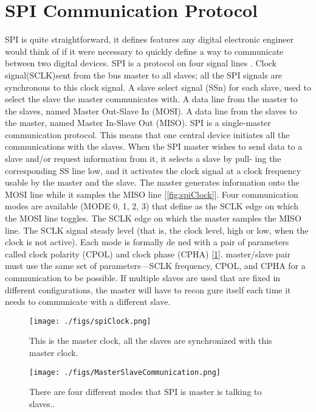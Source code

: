 \documentclass{IEEEtran}
\begin{document}
\section{SPI Communication Protocol}
SPI is quite straightforward, it defines features any digital electronic engineer would think of if it were necessary to quickly define a way to communicate between two digital devices. SPI is a protocol on four signal lines . Clock signal(SCLK)sent from the bus master to all slaves; all the SPI signals are synchronous to this clock signal. A slave select signal (SSn) for each slave, used to select the slave the master communicates with.  A data line from the master to the slaves, named Master Out-Slave In (MOSI).  A data line from the slaves to the master, named Master In-Slave Out (MISO). SPI is a single-master communication protocol. This means that one central device initiates all the communications with the slaves. When the SPI master wishes to send data to a slave and/or request information from it, it selects a slave by pull- ing the corresponding SS line low, and it activates the clock signal at a clock frequency usable by the master and the slave. The master generates information onto the MOSI line while it samples the MISO line [\ref{fig:spiClock}]. Four communication modes are available (MODE 0, 1, 2, 3) that define as  the SCLK edge on which the MOSI line toggles. The SCLK edge on which the master samples the MISO line. The SCLK signal steady level (that is, the clock level, high or low, when the clock is not active). Each mode is formally de ned with a pair of parameters called clock polarity (CPOL) and clock phase (CPHA) [\ref{fig:SPIMasterClock}].  master/slave pair must use the same set of parameters—SCLK frequency, CPOL, and CPHA for a communication to be possible. If multiple slaves are used that are fixed in different configurations, the master will have to recon gure itself each time it needs to communicate with a different slave.

\begin{figure}[h!]
\centering
\texttt{[image: ./figs/spiClock.png]}
\caption{ This is the master clock, all the slaves are synchronized  with this master clock. }
\label{fig:SPIMasterClock}
\end{figure}

\begin{figure}[h!]
\centering
\texttt{[image: ./figs/MasterSlaveCommunication.png]}
\caption{There are four different modes that SPI is master is talking to slaves.. }
\label{fig:SPICommunicationModes}
\end{figure}
\end{document}

